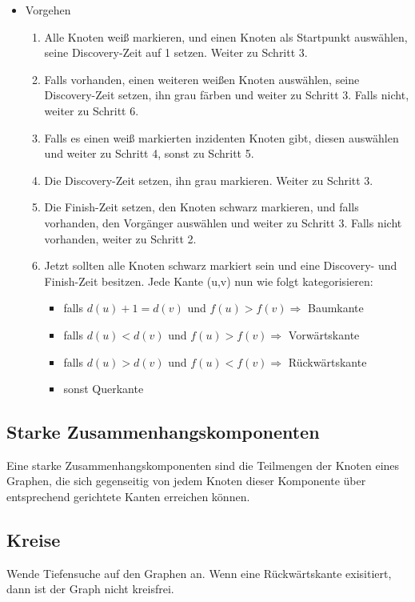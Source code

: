 \documentclass[11pt]{scrartcl}
\begin{document}
\begin{itemize}
\item Vorgehen
\begin{enumerate}
\item Alle Knoten weiß markieren, und einen Knoten als Startpunkt auswählen, seine Discovery-Zeit auf 1 setzen. Weiter zu Schritt 3.
\item Falls vorhanden, einen weiteren weißen Knoten auswählen, seine Discovery-Zeit setzen, ihn grau färben und weiter zu Schritt 3. Falls nicht, weiter zu Schritt 6.
\item Falls es einen weiß markierten inzidenten Knoten gibt, diesen auswählen und weiter zu Schritt 4, sonst zu Schritt 5.
\item Die Discovery-Zeit setzen, ihn grau markieren. Weiter zu Schritt 3.
\item Die Finish-Zeit setzen, den Knoten schwarz markieren, und falls vorhanden, den Vorgänger auswählen und weiter zu Schritt 3. Falls nicht vorhanden, weiter zu Schritt 2.
\item Jetzt sollten alle Knoten schwarz markiert sein und eine Discovery- und Finish-Zeit besitzen. Jede Kante (u,v) nun wie folgt kategorisieren:
\begin{itemize}
\item falls $d(u)+1=d(v)$ und $f(u)>f(v) \Rightarrow$ Baumkante
\item falls $d(u)<d(v)$ und $f(u)>f(v) \Rightarrow$ Vorwärtskante
\item falls $d(u)>d(v)$ und $f(u)<f(v) \Rightarrow$ Rückwärtskante
\item sonst Querkante
\end{itemize}
\end{enumerate}
\end{itemize}

\subsection{Starke Zusammenhangskomponenten}

Eine starke Zusammenhangskomponenten sind die Teilmengen der Knoten eines Graphen, die sich gegenseitig von jedem Knoten dieser Komponente über entsprechend gerichtete Kanten erreichen können.

\subsection{Kreise}
Wende Tiefensuche auf den Graphen an. Wenn eine Rückwärtskante exisitiert, dann ist der Graph nicht kreisfrei.
\end{document}
